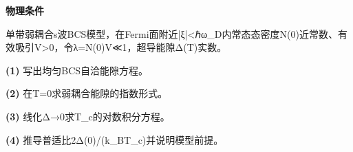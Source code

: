 \textbf{物理条件}\par 单带弱耦合s波BCS模型，在Fermi面附近|ξ|<ℏω\_D内常态态密度N(0)近常数、有效吸引V>0，令λ=N(0)V≪1，超导能隙Δ(T)实数。
\par\noindent\textbf{(1)} 写出均匀BCS自洽能隙方程。
\par\noindent\textbf{(2)} 在T=0求弱耦合能隙的指数形式。
\par\noindent\textbf{(3)} 线化Δ→0求T\_c的对数积分方程。
\par\noindent\textbf{(4)} 推导普适比2Δ(0)/(k\_BT\_c)并说明模型前提。
